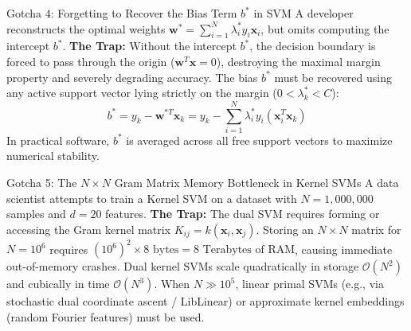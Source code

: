 \begin{trapbox}{Gotcha 4: Forgetting to Recover the Bias Term $b^*$ in SVM}
A developer reconstructs the optimal weights $\mathbf{w}^* = \sum_{i=1}^N \lambda_i^* y_i \mathbf{x}_i$, but omits computing the intercept $b^*$.
\tcblower
\textbf{The Trap:} Without the intercept $b^*$, the decision boundary is forced to pass through the origin ($\mathbf{w}^T \mathbf{x} = 0$), destroying the maximal margin property and severely degrading accuracy. The bias $b^*$ must be recovered using any active support vector lying strictly on the margin ($0 < \lambda_k^* < C$):
\begin{equation}
b^* = y_k - \mathbf{w}^{*T} \mathbf{x}_k = y_k - \sum_{i=1}^N \lambda_i^* y_i (\mathbf{x}_i^T \mathbf{x}_k)
\end{equation}
In practical software, $b^*$ is averaged across all free support vectors to maximize numerical stability.
\end{trapbox}

\begin{trapbox}{Gotcha 5: The $N \times N$ Gram Matrix Memory Bottleneck in Kernel SVMs}
A data scientist attempts to train a Kernel SVM on a dataset with $N = 1{,}000{,}000$ samples and $d = 20$ features.
\tcblower
\textbf{The Trap:} The dual SVM requires forming or accessing the Gram kernel matrix $K_{ij} = k(\mathbf{x}_i, \mathbf{x}_j)$. Storing an $N \times N$ matrix for $N = 10^6$ requires $(10^6)^2 \times 8 \text{ bytes} = 8 \text{ Terabytes of RAM}$, causing immediate out-of-memory crashes. Dual kernel SVMs scale quadratically in storage $\mathcal{O}(N^2)$ and cubically in time $\mathcal{O}(N^3)$. When $N \gg 10^5$, linear primal SVMs (e.g., via stochastic dual coordinate ascent / LibLinear) or approximate kernel embeddings (random Fourier features) must be used.
\end{trapbox}

